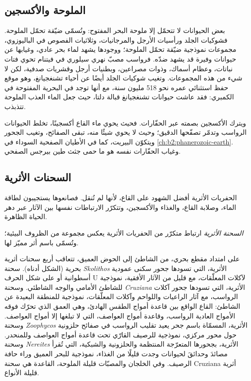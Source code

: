 \subsection*{الملوحة والأكسجين}

بعض الحيوانات لا تتحمّل إلا ملوحة البحر المفتوح: وتُسمّى ضيّقة تحمّل الملوحة. فشوكيات الجلد
ورأسيات الأرجل والمرجانيات، وثلاثيات الفصوص في الباليوزوي، مجموعات نموذجية ضيّقة تحمّل الملوحة؛
ووجودها يشهد لماء بحر عادي، وغيابها عن حيوانات وفيرة قد يشهد ضدّه.
فرواسب مصبّ نهري سيلوري في فيتنام تحوي فتات نباتات، وعظام أسماك، وذوات مصراعين، وبطنيات أرجل
وقشريات صدفية، لكن لا شيء من هذه المجموعات. وتغيب شوكيات الجلد أيضًا عن أحياء تشنغجيانغ،
وهو موقع حفظ استثنائي عمره نحو 518 مليون سنة، مع أنها توجد في  البحرية المفتوحة في
الكمبري: فقد عاشت حيوانات تشنغجيانغ قبالة دلتا، حيث جعل الماء العذب الملوحة تتذبذب.

ويترك الأكسجين بصمته عبر الحفّارات. فحيث يحوي ماء القاع أكسجينًا، تخلط الحيوانات
الرواسب وتدمّر تصفّحها الدقيق؛ وحيث لا يحوي شيئًا منه، تبقى الصفائح، وتغيب الجحور
ويتكوّن البيريت، كما في الأطيان الصفحية السوداء  في
\cref{ch:b2:phanerozoic-earth}. وغياب الحفّارات نفسه هو ما حمى جثث طين بيرجس
الصفحي.

\subsection*{السحنات الأثرية}

الحفريات الأثرية أفضل الشهود على القاع، لأنها لم تُنقل. فصانعوها
يستجيبون لطاقة الماء، وصلابة القاع، والغذاء والأكسجين،
وتتكرّر الارتباطات نفسها بين الآثار عبر دهر الحياة الظاهرة.

\begin{definition}\label{def:b2:palaeoenvironments:ichnofacies}
\emph{السحنة الأثرية} ارتباط متكرّر من الحفريات الأثرية
يعكس مجموعة من الظروف البيئية؛ وتُسمّى باسم أثر مميّز لها.
\end{definition}

على امتداد مقطع بحري، من الشاطئ إلى الحوض العميق، تتعاقب أربع سحنات أثرية بحرية
(الشكل أدناه). سحنة \emph{Skolithos} الأثرية، التي تسودها جحور سكنى عمودية أسطوانية أو
على شكل الحرف U لآكلات المعلّقات، مع قليل من الآثار الأفقية، نموذجية
للشاطئ الأمامي والوجه الشاطئي. وسحنة \emph{Cruziana} الأثرية، التي تسودها جحور
آكلات الرواسب، مع آثار الراعيات واللواحم وآكلات المعلّقات، نموذجية
للمنطقة البعيدة عن الشاطئ: القاع الواقع بين قاعدة أمواج الطقس الهادئ، وهي العمق الذي تحرّك فوقه الأمواج العادية
الرواسب، وقاعدة أمواج العواصف، التي لا تبلغها إلا أمواج العواصف. وسحنة \emph{Zoophycos}
الأثرية، المسمّاة باسم جحر يعيد تقليب الرواسب في صفائح حلزونية حول محور
مركزي، نموذجية للرصيف القارّي تحت قاعدة أمواج العواصف وللمنحدر. وسحنة \emph{Nereites}
الأثرية، بجحورها المتعرّجة المنتظمة والحلزونية والشبكية، التي تُقرأ مصائدَ
وحدائقَ لحيوانات وجدت قليلًا من الغذاء، نموذجية للبحر العميق وراء حافة الرصيف. وفي
الخلجان والمصبّات قليلة الملوحة، القاعدة هي سحنة Cruziana أثرية قليلة الأنواع.

